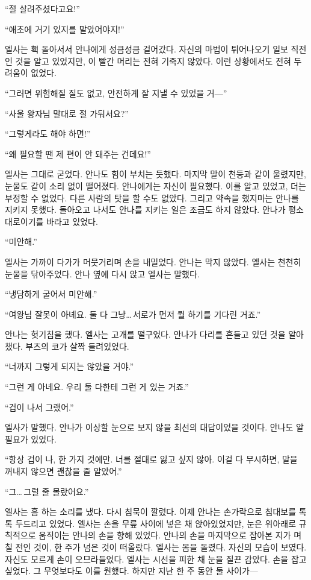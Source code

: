 ``절 살려주셨다고요!''

``애초에 거기 있지를 말았어야지!''

엘사는 홱 돌아서서 안나에게 성큼성큼 걸어갔다. 자신의 마법이 튀어나오기 일보 직전인 것을 알고 있었지만, 이 빨간 머리는 전혀 기죽지 않았다. 이런 상황에서도 전혀 두려움이 없었다.

``그러면 위험해질 질도 없고, 안전하게 잘 지낼 수 있었을 거—''

``사울 왕자님 말대로 절 가둬서요?''

``그렇게라도 해야 하면!''

``왜 필요할 땐 제 편이 안 돼주는 건데요!''

엘사는 그대로 굳었다. 안나도 힘이 부치는 듯했다. 마지막 말이 천둥과 같이 울렸지만, 눈물도 같이 소리 없이 떨어졌다. 안나에게는 자신이 필요했다. 이를 알고 있었고, 더는 부정할 수 없었다. 다른 사람의 탓을 할 수도 없았다. 그리고 약속을 했지마는 안나를 지키지 못했다. 돌아오고 나서도 안나를 지키는 일은 조금도 하지 않았다. 안나가 평소대로이기를 바라고 있었다.

``미안해.''

엘사는 가까이 다가가 머뭇거리며 손을 내밀었다. 안나는 막지 않았다. 엘사는 천천히 눈물을 닦아주었다. 안나 옆에 다시 앉고 엘사는 말했다.

``냉담하게 굴어서 미안해.''

``여왕님 잘못이 아녜요. 둘 다 그냥\ldots\,서로가 먼저 뭘 하기를 기다린 거죠.''

안나는 헛기침을 했다. 엘사는 고개를 떨구었다. 안나가 다리를 흔들고 있던 것을 알아챘다. 부츠의 코가 살짝 들려있었다.

``너까지 그렇게 되지는 않았을 거야.''

``그런 게 아녜요. 우리 둘 다한테 그런 게 있는 거죠.''

``겁이 나서 그랬어.''

엘사가 말했다. 안나가 이상할 눈으로 보지 않을 최선의 대답이었을 것이다. 안나도 알 필요가 있었다.

``항상 겁이 나, 한 가지 것에만. 너를 절대로 잃고 싶지 않아. 이걸 다 무시하면, 말을 꺼내지 않으면 괜찮을 줄 알았어.''

``그\ldots\,그럴 줄 몰랐어요.''

엘사는 흠 하는 소리를 냈다. 다시 침묵이 깔렸다. 이제 안나는 손가락으로 침대보를 톡톡 두드리고 있었다. 엘사는 손을 무릎 사이에 넣은 채 앉아있었지만, 눈은 위아래로 규칙적으로 움직이는 안나의 손을 향해 있었다. 안나의 손을 마지막으로 잡아본 지가 며칠 전인 것이, 한 주가 넘은 것이 떠올랐다. 엘사는 몸을 돌렸다. 자신의 모습이 보였다. 자신도 모르게 손이 오므라들었다. 엘사는 시선을 피한 채 눈을 질끈 감았다. 손을 잡고 싶었다. 그 무엇보다도 이를 원했다. 하지만 지난 한 주 동안 둘 사이가—


